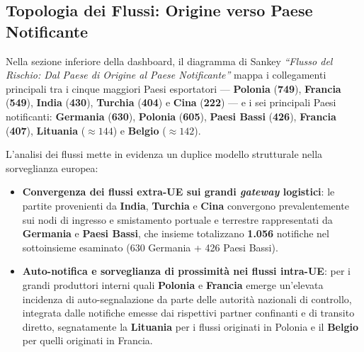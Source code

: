 \subsection{Topologia dei Flussi: Origine verso Paese Notificante}
Nella sezione inferiore della dashboard, il diagramma di Sankey \textit{``Flusso del Rischio: Dal Paese di Origine al Paese Notificante''} mappa i collegamenti principali tra i cinque maggiori Paesi esportatori --- \textbf{Polonia} (\textbf{749}), \textbf{Francia} (\textbf{549}), \textbf{India} (\textbf{430}), \textbf{Turchia} (\textbf{404}) e \textbf{Cina} (\textbf{222}) --- e i sei principali Paesi notificanti: \textbf{Germania} (\textbf{630}), \textbf{Polonia} (\textbf{605}), \textbf{Paesi Bassi} (\textbf{426}), \textbf{Francia} (\textbf{407}), \textbf{Lituania} ($\approx 144$) e \textbf{Belgio} ($\approx 142$).

L'analisi dei flussi mette in evidenza un duplice modello strutturale nella sorveglianza europea:
\begin{itemize}
    \item \textbf{Convergenza dei flussi extra-UE sui grandi \textit{gateway} logistici}: le partite provenienti da \textbf{India}, \textbf{Turchia} e \textbf{Cina} convergono prevalentemente sui nodi di ingresso e smistamento portuale e terrestre rappresentati da \textbf{Germania} e \textbf{Paesi Bassi}, che insieme totalizzano \textbf{1.056} notifiche nel sottoinsieme esaminato (630 Germania + 426 Paesi Bassi).
    \item \textbf{Auto-notifica e sorveglianza di prossimità nei flussi intra-UE}: per i grandi produttori interni quali \textbf{Polonia} e \textbf{Francia} emerge un'elevata incidenza di auto-segnalazione da parte delle autorità nazionali di controllo, integrata dalle notifiche emesse dai rispettivi partner confinanti e di transito diretto, segnatamente la \textbf{Lituania} per i flussi originati in Polonia e il \textbf{Belgio} per quelli originati in Francia.
\end{itemize}

